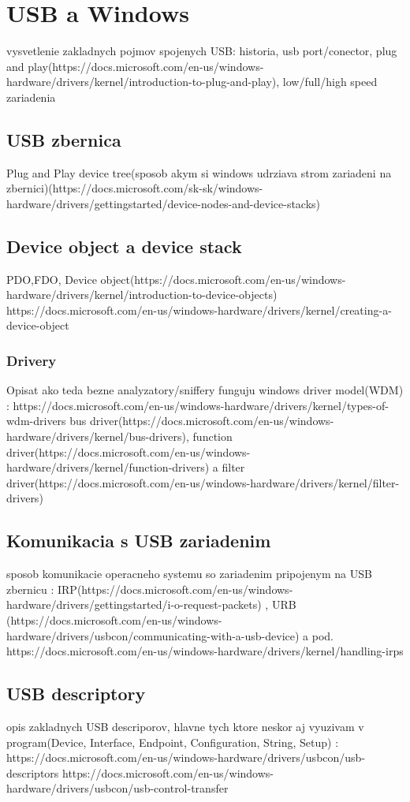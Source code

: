 \chapter{USB a Windows}
vysvetlenie zakladnych pojmov spojenych USB: historia, usb port/conector, plug and play(https://docs.microsoft.com/en-us/windows-hardware/drivers/kernel/introduction-to-plug-and-play), low/full/high speed zariadenia
\section{USB zbernica}
Plug and Play device tree(sposob akym si windows udrziava strom zariadeni na zbernici)(https://docs.microsoft.com/sk-sk/windows-hardware/drivers/gettingstarted/device-nodes-and-device-stacks)
\section{Device object a device stack}
PDO,FDO, Device object(https://docs.microsoft.com/en-us/windows-hardware/drivers/kernel/introduction-to-device-objects)
https://docs.microsoft.com/en-us/windows-hardware/drivers/kernel/creating-a-device-object
\subsection{Drivery}
Opisat ako teda bezne analyzatory/sniffery funguju
windows driver model(WDM) : https://docs.microsoft.com/en-us/windows-hardware/drivers/kernel/types-of-wdm-drivers
bus driver(https://docs.microsoft.com/en-us/windows-hardware/drivers/kernel/bus-drivers), function driver(https://docs.microsoft.com/en-us/windows-hardware/drivers/kernel/function-drivers) a filter driver(https://docs.microsoft.com/en-us/windows-hardware/drivers/kernel/filter-drivers)
\section{Komunikacia s USB zariadenim}
sposob komunikacie operacneho systemu so zariadenim pripojenym na USB zbernicu : IRP(https://docs.microsoft.com/en-us/windows-hardware/drivers/gettingstarted/i-o-request-packets) , URB (https://docs.microsoft.com/en-us/windows-hardware/drivers/usbcon/communicating-with-a-usb-device) a pod.
https://docs.microsoft.com/en-us/windows-hardware/drivers/kernel/handling-irps
\section{USB descriptory}
opis zakladnych USB descriporov, hlavne tych ktore neskor aj vyuzivam v program(Device, Interface, Endpoint, Configuration, String, Setup) : https://docs.microsoft.com/en-us/windows-hardware/drivers/usbcon/usb-descriptors
https://docs.microsoft.com/en-us/windows-hardware/drivers/usbcon/usb-control-transfer
